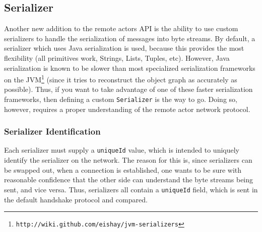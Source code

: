 \documentclass{article}
\begin{document}
\subsection{Serializer}
Another new addition to the remote actors API is the ability to use custom serializers
to handle the serialization of messages into byte streams. By default, a serializer which
uses Java serialization is used, because this provides the most flexibility (all primitives work,
Strings, Lists, Tuples, etc). However, Java serialization is known to be slower than most
specialized serialization frameworks on the JVM\footnote{\texttt{http://wiki.github.com/eishay/jvm-serializers}}
(since it tries to reconstruct the object graph as accurately as possible). Thus, if you want
to take advantage of one of these faster serialization frameworks, then defining a
custom \verb|Serializer| is the way to go. Doing so, however, requires a proper understanding
of the remote actor network protocol.

\subsubsection{Serializer Identification}
Each serializer must supply a \verb|uniqueId| value, which is intended to uniquely identify the
serializer on the network. The reason for this is, since serializers can be swapped out, when
a connection is established, one wants to be sure with reasonable confidence that the other
side can understand the byte streams being sent, and vice versa. Thus, serializers all contain
a \verb|uniqueId| field, which is sent in the default handshake protocol and compared.
\end{document}
